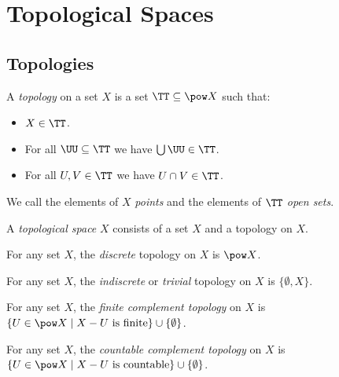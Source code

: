 \newcommand{\support}{\ensuremath{\operatorname{support}}}

\chapter{Topological Spaces}

\section{Topologies}
\begin{definition}[Topology]
    A \emph{topology} on a set $X$ is a set $\TT \subseteq \pow X$ such that:
    \begin{itemize}
        \item $X \in \TT$.
        \item For all $\UU \subseteq \TT$ we have $\bigcup \UU \in \TT$.
        \item For all $U, V \in \TT$ we have $U \cap V \in \TT$.
    \end{itemize}
    We call the elements of $X$ \emph{points} and the elements of $\TT$ \emph{open sets}.
\end{definition}

\begin{definition}
    A \emph{topological space} $X$ consists of a set $X$ and a topology on $X$.
\end{definition}

\begin{definition}
    For any set $X$, the \emph{discrete} topology on $X$ is $\pow X$.
\end{definition}

\begin{definition}
    For any set $X$, the \emph{indiscrete} or \emph{trivial} topology on $X$ is $\{ \emptyset, X \}$.
\end{definition}

\begin{definition}
    For any set $X$, the \emph{finite complement topology} on $X$ is $\{ U \in \pow X \mid X - U \text{ is finite} \} 
    \cup \{ \emptyset \}$.
\end{definition}

\begin{definition}
    For any set $X$, the \emph{countable complement topology} on $X$ is $\{ U \in \pow X \mid X - U \text{ is countable} \} 
    \cup \{ \emptyset \}$.
\end{definition}

